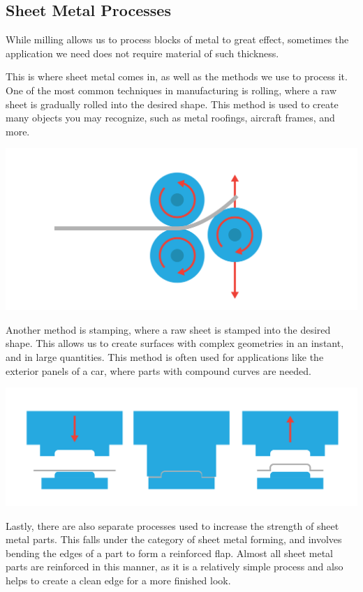 \subsection{Sheet Metal Processes}

While milling allows us to process blocks of metal to great effect, sometimes the application we need does not require material of such thickness.

This is where sheet metal comes in, as well as the methods we use to process it. One of the most common techniques in manufacturing is rolling, where a raw sheet is gradually rolled into the desired shape. This method is used to create many objects you may recognize, such as metal roofings, aircraft frames, and more.
\begin{center}
    
    \includegraphics[width=.75\textwidth]{rolling.png}
\end{center}


Another method is stamping, where a raw sheet is stamped into the desired shape. This allows us to create surfaces with complex geometries in an instant, and in large quantities. This method is often used for applications like the exterior panels of a car, where parts with compound curves are needed.
\begin{center}
    
    \includegraphics[width=.75\textwidth]{stamping.png}
\end{center}



Lastly, there are also separate processes used to increase the strength of sheet metal parts. This falls under the category of sheet metal forming, and involves bending the edges of a part to form a reinforced flap. Almost all sheet metal parts are reinforced in this manner, as it is a relatively simple process and also helps to create a clean edge for a more finished look.

